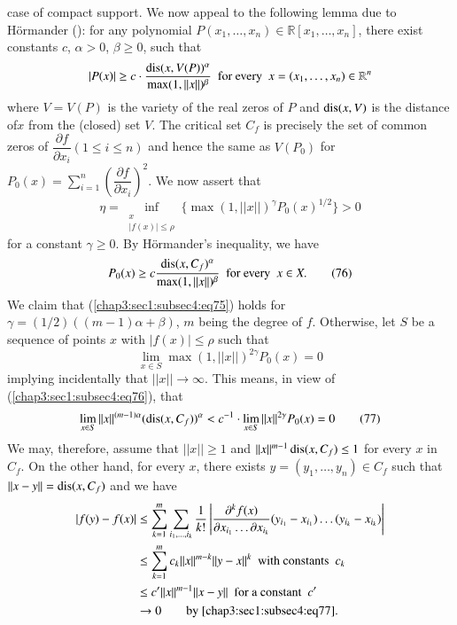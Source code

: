case of compact support. We now appeal to the following lemma due to
H\"ormander (\cite{Hor 1}): for any polynomial $P(x_{1},\ldots,x_{n})\in
\mathbb{R}[x_{1},\ldots,x_{n}]$, there exist constants $c$,
$\alpha>0$, $\beta \geq 0$, such that
$$
|P(x)|\geq c\cdot
\frac{\operatorname{dis}(x,V(P))^{\alpha}}{\max(1,||x||)^{\beta}}\text{ \ for  every
  \ } x=(x_{1},\ldots,x_{n})\in \mathbb{R}^{n} 
$$
where $V=V(P)$ is the variety of the real zeros of $P$ and $\operatorname{dis}(x,V)$
is the distance of\pageoriginale $x$ from the (closed) set $V$. The
critical set $C_{f}$ is precisely the set of common zeros of
$\dfrac{\partial f}{\partial x_{i}}(1\leq i\leq n)$ and hence the same
as $V(P_{0})$ for $P_{0}(x)=\sum\limits^{n}_{i=1}\left(\dfrac{\partial
  f}{\partial x_{i}}\right)^{2}$. We now assert that
\begin{equation*}
  \eta=\inf\limits_{\substack{x\\ |f(x)|\leq
      \rho}}\{\max(1,||x||)^{\gamma}P_{0}(x)^{1/2}\}>0
  \tag{75} \label{chap3:sec1:subsec4:eq75}  
\end{equation*}
for a constant $\gamma\geq 0$. By H\"ormander's inequality, we have
\begin{equation*}
P_{0}(x)\geq
c\frac{\operatorname{dis}(x,C_{f})^{\alpha}}{\max(1,||x||)^{\beta}}\text{ \ for
  every \ } x\in X.\tag{76}\label{chap3:sec1:subsec4:eq76}
\end{equation*}
We claim that (\ref{chap3:sec1:subsec4:eq75}) holds for
$\gamma=(1/2)((m-1)\alpha+\beta)$, 
$m$ being the degree of $f$. Otherwise, let $S$ be a sequence of
points $x$ with $|f(x)|\leq \rho$ such that 
$$
\lim\limits_{x\in S}\max (1,||x||)^{2\gamma}P_{0}(x)=0
$$
implying incidentally that $||x||\to\infty$. This means, in view of
(\ref{chap3:sec1:subsec4:eq76}), that
\begin{equation*}
\lim\limits_{x\in
  S}||x||^{(m-1)\alpha}(\operatorname{dis}(x,C_{f}))^{\alpha}<c^{-1}\cdot
\lim\limits_{x\in S}||x||^{2\gamma}P_{0}(x)=0
\tag{77}\label{chap3:sec1:subsec4:eq77}
\end{equation*}
We may, therefore, assume that $||x||\geq 1$ and $||x||^{m-1}\operatorname{dis}
(x,C_{f})\leq 1$ for every $x$ in $C_{f}$. On the other hand, for
every $x$, there exists $y=(y_{1},\ldots,y_{n})\in C_{f}$ such that
$||x-y||=\operatorname{dis}(x,C_{f})$ and we have
\begin{align*}
|f(y)-f(x)| &\leq
\sum^{m}_{k=1}\sum_{i_{1},\ldots,i_{k}}\frac{1}{k!}\left|\frac{\partial^{k}f(x)}{\partial
  x_{i_{1}}\ldots \partial x_{i_{k}}}(y_{i_{1}}-x_{i_{1}})\ldots
(y_{i_{k}}-x_{i_{k}})\right|\\
&\leq \sum^{m}_{k=1}c_{k}||x||^{m-k}||y-x||^{k}\text{ \ with constants
  \ } c_{k}\\
&\leq c'||x||^{m-1}||x-y||\text{ \  for a constant \ } c'\\
&\to 0\qquad \text{by \ref{chap3:sec1:subsec4:eq77}.}
\end{align*}
